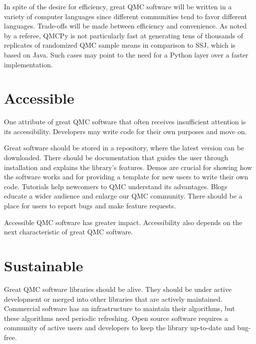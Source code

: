 \documentclass[graybox]{svmult}
\begin{document}
In spite of the desire for efficiency, great QMC software will be written in a variety of computer languages since different communities tend to favor different languages. Trade-offs will be made between efficiency and convenience.
As noted by a referee, QMCPy is not particularly fast at generating tens of thousands of replicates of randomized QMC sample means in comparison to SSJ, which is based on Java. Such cases may point to the need for a Python layer over a faster implementation.

\section{Accessible} \label{CDHJS_sec:accessible}
One attribute of great QMC software that often receives insufficient attention is its accessibility.  Developers may write code for their own purposes and move on.

Great software should be stored in a repository, where the latest version can be downloaded.  There should be documentation that guides the user through installation and explains the library's features.  Demos are crucial for showing how the software works and for providing a template for new users to write their own code.  Tutorials help newcomers to QMC understand its advantages. Blogs educate a wider audience and enlarge our QMC community.  There should be a place for users to report bugs and make feature requests.

Accessible QMC software has greater impact.  Accessibility also depends on the next characteristic of great QMC software.


\section{Sustainable} \label{CDHJS_sec:sustainable}
Great QMC software libraries should be alive.  They should be under active development or merged into other libraries that are actively maintained.  Commercial software has an infrastructure to maintain their algorithms, but these algorithms need periodic refreshing. Open source software requires a community of active users and developers to keep the library up-to-date and bug-free.
\end{document}

